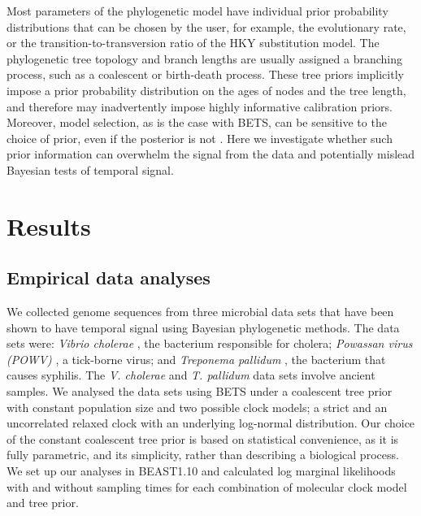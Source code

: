 \documentclass[10pt,letterpaper]{article}
\begin{document}
Most parameters of the phylogenetic model have individual prior probability distributions that can be chosen by the user, for example, the evolutionary rate, or the transition-to-transversion ratio of the HKY substitution model. The phylogenetic tree topology and branch lengths are usually assigned a branching process, such as a coalescent or birth-death process. These tree priors implicitly impose a prior probability distribution on the ages of nodes and the tree length, and therefore may inadvertently impose highly informative calibration priors. Moreover, model selection, as is the case with BETS, can be sensitive to the choice of prior, even if the posterior is not \cite{gelman1995avoiding, gelman2014bayesian}. Here we investigate whether such prior information can overwhelm the signal from the data and potentially mislead Bayesian tests of temporal signal.

\section*{Results}
\subsection*{Empirical data analyses}
We collected genome sequences from three microbial data sets that have been shown to have temporal signal using Bayesian phylogenetic methods. The data sets were: \textit{Vibrio cholerae} \cite{devault2014second}, the bacterium responsible for cholera; \textit{Powassan virus (POWV)} \cite{majander2020ancient}, a tick-borne virus; and \textit{Treponema pallidum} \cite{vogels2023phylogeographic}, the bacterium that causes syphilis. The \textit{V. cholerae} and \textit{T. pallidum} data sets involve ancient samples. We analysed the data sets using BETS under a coalescent tree prior with constant population size and two possible clock models; a strict and an uncorrelated relaxed clock with an underlying log-normal distribution. Our choice of the constant coalescent tree prior is based on statistical convenience, as it is fully parametric, and its simplicity, rather than describing a biological process. We set up our analyses in BEAST1.10 \cite{suchard2018bayesian} and calculated log marginal likelihoods with and without sampling times for each combination of molecular clock model and tree prior. 
\end{document}
